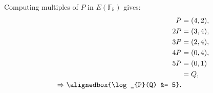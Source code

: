 \documentclass[
  coursecode={MTHE 418},
  assignmentname={Homework \homeworknumber},
  studentnumber=20053722,
  name={Bryan Hoang},
  draft,
]{
  ltxanswer%
}
\begin{document}
  \begin{questions}
    \setcounter{question}{\questionnumber}
    \addtocounter{question}{-1}
    \question[10]
    \begin{solution}
      Computing multiples of \(P\) in \(E(\mathbb{F}_{5})\) gives:
      \begin{align*}
        P                                   &= (4, 2), \\
        2P                                  &= (3, 4), \\
        3P                                  &= (2, 4), \\
        4P                                  &= (0, 4), \\
        5P                                  &= (0, 1)  \\
                                            &= Q,      \\
        \Rightarrow \alignedbox{\log_{P}(Q) &= 5}.
      \end{align*}
    \end{solution}
  \end{questions}
\end{document}
